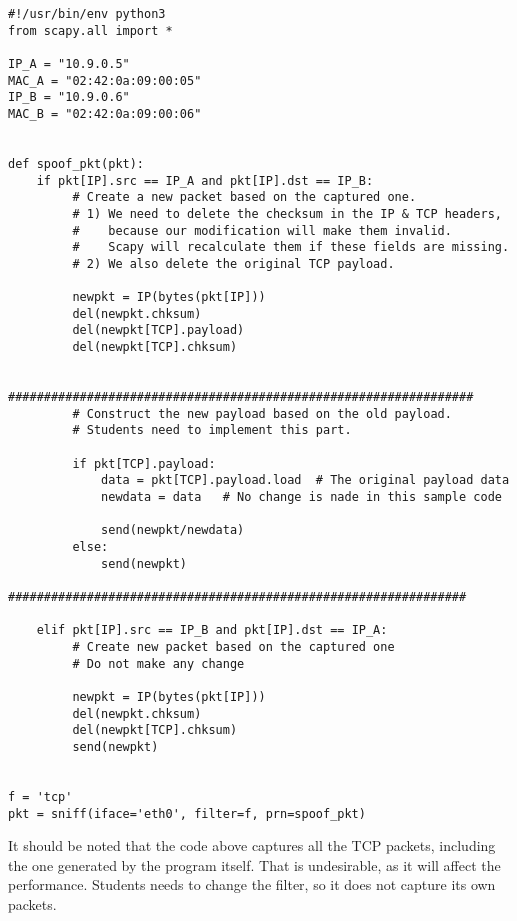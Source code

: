 \begin{lstlisting}
#!/usr/bin/env python3
from scapy.all import *

IP_A = "10.9.0.5"
MAC_A = "02:42:0a:09:00:05"
IP_B = "10.9.0.6"
MAC_B = "02:42:0a:09:00:06"


def spoof_pkt(pkt):
    if pkt[IP].src == IP_A and pkt[IP].dst == IP_B:
         # Create a new packet based on the captured one.
         # 1) We need to delete the checksum in the IP & TCP headers, 
         #    because our modification will make them invalid.
         #    Scapy will recalculate them if these fields are missing. 
         # 2) We also delete the original TCP payload.

         newpkt = IP(bytes(pkt[IP]))
         del(newpkt.chksum)
         del(newpkt[TCP].payload)
         del(newpkt[TCP].chksum)

         #################################################################
         # Construct the new payload based on the old payload.
         # Students need to implement this part.

         if pkt[TCP].payload:
             data = pkt[TCP].payload.load  # The original payload data
             newdata = data   # No change is nade in this sample code

             send(newpkt/newdata)
         else:
             send(newpkt)
         ################################################################

    elif pkt[IP].src == IP_B and pkt[IP].dst == IP_A:
         # Create new packet based on the captured one 
         # Do not make any change 

         newpkt = IP(bytes(pkt[IP]))
         del(newpkt.chksum)
         del(newpkt[TCP].chksum)
         send(newpkt)


f = 'tcp'
pkt = sniff(iface='eth0', filter=f, prn=spoof_pkt)
\end{lstlisting}


It should be noted that the code above captures all the TCP 
packets, including the one generated by the program itself. That is 
undesirable, as it will affect
the performance. Students needs to change the filter, so it does not capture 
its own packets. 


